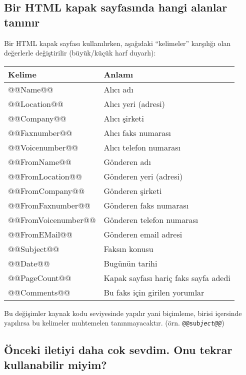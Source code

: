 \documentclass[a4paper,10pt]{scrartcl}
\begin{document}
 \subsection{Bir HTML kapak sayfasında hangi alanlar tanınır}
Bir HTML kapak sayfası kullanılırken, aşağıdaki ``kelimeler'' karşılığı olan değerlerle değiştirilir (büyük/küçük harf duyarlı):

\begin{center}
\begin{tabular}{|l|l|}
\hline
\bfseries Kelime & \bfseries Anlamı \\
\hline\hline
\ttfamily @@Name@@ & Alıcı adı \\\hline
\ttfamily @@Location@@ & Alıcı yeri (adresi) \\\hline
\ttfamily @@Company@@ & Alıcı şirketi \\\hline
\ttfamily @@Faxnumber@@ & Alıcı faks numarası \\\hline
\ttfamily @@Voicenumber@@ & Alıcı telefon numarası \\\hline
\ttfamily @@FromName@@ & Gönderen adı \\\hline
\ttfamily @@FromLocation@@ & Gönderen yeri (adresi) \\\hline
\ttfamily @@FromCompany@@ & Gönderen şirketi \\\hline
\ttfamily @@FromFaxnumber@@ & Gönderen faks numarası \\\hline
\ttfamily @@FromVoicenumber@@ & Gönderen telefon numarası \\\hline
\ttfamily @@FromEMail@@ & Gönderen email adresi \\\hline
\ttfamily @@Subject@@ & Faksın konusu \\\hline
\ttfamily @@Date@@ & Bugünün tarihi \\\hline
\ttfamily @@PageCount@@ & Kapak sayfası hariç faks sayfa adedi \\\hline
\ttfamily @@Comments@@ & Bu faks için girilen yorumlar \\\hline
\end{tabular}
\end{center}

Bu değişimler kaynak kodu seviyesinde yapılır yani biçimleme, birisi içersinde yapılırsa bu kelimeler muhtemelen tanınmayacaktır. (örn. \texttt{@@sub\textit{ject@@}})

\subsection{Önceki iletiyi daha cok sevdim. Onu tekrar kullanabilir miyim?}
\end{document}
